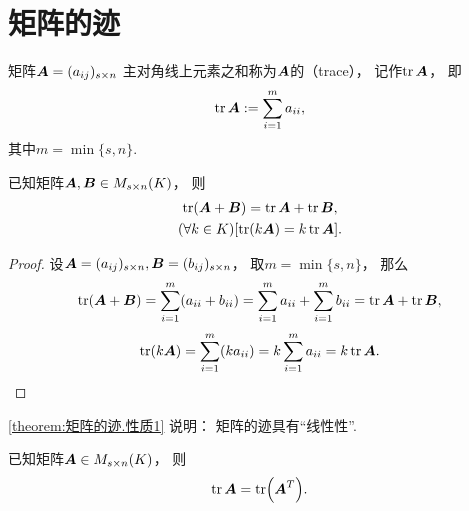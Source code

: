 \section{矩阵的迹}
\begin{definition}
矩阵\(\boldsymbol{A}=(a_{ij})_{s \times n}\)
主对角线上元素之和称为\(\boldsymbol{A}\)的（trace），
记作\(\tr\boldsymbol{A}\)，
即\begin{equation*}
	\tr\boldsymbol{A}
	:=
	\sum_{i=1}^m a_{ii},
\end{equation*}
其中\(m = \min\{s,n\}\).
\end{definition}

\begin{property}\label{theorem:矩阵的迹.性质1}
已知矩阵\(\boldsymbol{A},\boldsymbol{B} \in M_{s \times n}(K)\)，
则\begin{gather}
	\tr(\boldsymbol{A}+\boldsymbol{B}) = \tr\boldsymbol{A} + \tr\boldsymbol{B}, \\
	(\forall k \in K)[\tr(k \boldsymbol{A}) = k \tr\boldsymbol{A}].
\end{gather}
\begin{proof}
设\(\boldsymbol{A}=(a_{ij})_{s \times n},
\boldsymbol{B}=(b_{ij})_{s \times n}\)，
取\(m = \min\{s,n\}\)，
那么\begin{equation*}
	\tr(\boldsymbol{A}+\boldsymbol{B}) = \sum_{i=1}^m (a_{ii}+b_{ii})
	= \sum_{i=1}^m a_{ii}
	+ \sum_{i=1}^m b_{ii}
	= \tr\boldsymbol{A} + \tr\boldsymbol{B},
\end{equation*}\begin{equation*}
	\tr(k \boldsymbol{A}) = \sum_{i=1}^m (k a_{ii})
	= k \sum_{i=1}^m a_{ii}
	= k \tr\boldsymbol{A}.
	\qedhere
\end{equation*}
\end{proof}
\end{property}
\begin{remark}
\cref{theorem:矩阵的迹.性质1} 说明：
矩阵的迹具有“线性性”.
\end{remark}

\begin{property}\label{theorem:矩阵的迹.矩阵转置不变迹}
已知矩阵\(\boldsymbol{A} \in M_{s \times n}(K)\)，
则\begin{equation}
	\tr\boldsymbol{A} = \tr(\boldsymbol{A}^T).
\end{equation}
\end{property}

